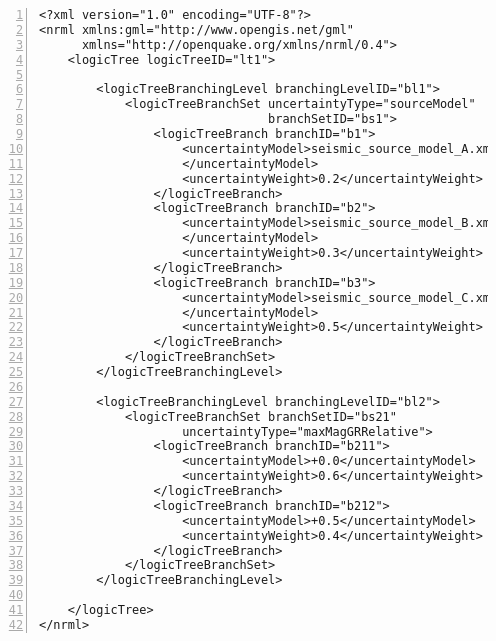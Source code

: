 \begin{Verbatim}[frame=single, commandchars=\\\{\}, fontsize=\small,
    firstnumber=1, numbers=left, numbersep=2pt]
<?xml version="1.0" encoding="UTF-8"?>
<nrml xmlns:gml="http://www.opengis.net/gml"
      xmlns="http://openquake.org/xmlns/nrml/0.4">
    <logicTree logicTreeID="lt1">

        <logicTreeBranchingLevel branchingLevelID="bl1">
            <logicTreeBranchSet uncertaintyType="sourceModel"
                                branchSetID="bs1">
                <logicTreeBranch branchID="b1">
                    <uncertaintyModel>seismic_source_model_A.xml
                    </uncertaintyModel>
                    <uncertaintyWeight>0.2</uncertaintyWeight>
                </logicTreeBranch>
                <logicTreeBranch branchID="b2">
                    <uncertaintyModel>seismic_source_model_B.xml
                    </uncertaintyModel>
                    <uncertaintyWeight>0.3</uncertaintyWeight>
                </logicTreeBranch>
                <logicTreeBranch branchID="b3">
                    <uncertaintyModel>seismic_source_model_C.xml
                    </uncertaintyModel>
                    <uncertaintyWeight>0.5</uncertaintyWeight>
                </logicTreeBranch>
            </logicTreeBranchSet>
        </logicTreeBranchingLevel>

        <logicTreeBranchingLevel branchingLevelID="bl2">
            <logicTreeBranchSet branchSetID="bs21" 
                    uncertaintyType="maxMagGRRelative">
                <logicTreeBranch branchID="b211">
                    <uncertaintyModel>+0.0</uncertaintyModel>
                    <uncertaintyWeight>0.6</uncertaintyWeight>
                </logicTreeBranch>
                <logicTreeBranch branchID="b212">
                    <uncertaintyModel>+0.5</uncertaintyModel>
                    <uncertaintyWeight>0.4</uncertaintyWeight>
                </logicTreeBranch>
            </logicTreeBranchSet>
        </logicTreeBranchingLevel>

    </logicTree>
</nrml>
\end{Verbatim}